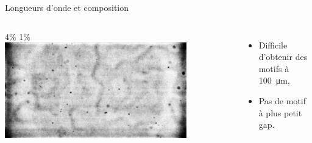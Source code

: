 \documentclass{beamer}
\begin{document}
\begin{frame}{Longueurs d'onde et composition}
\begin{columns}[T]
4\% 1\%\\
\includegraphics[width=0.8\textwidth]{motif_cas4_GDL1.jpg}
\begin{itemize}
\item Difficile d'obtenir des motifs à \SI{100}{\micro\metre}, 
\item Pas de motif à plus petit gap.
\end{itemize}
\end{columns}
\end{frame}
\end{document}
